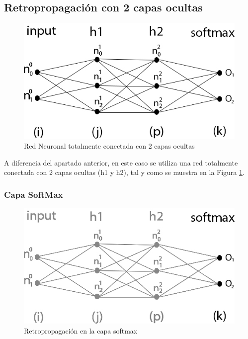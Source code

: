 \subsection{Retropropagación con 2 capas ocultas}

\begin{figure}[H]
	\centering
	\includegraphics[scale=0.35]{imagenes/nn_2_capas.jpg}  
	\caption{Red Neuronal totalmente conectada con 2 capas ocultas}
	\label{fig:nn_2_capas}
\end{figure}

A diferencia del apartado anterior, en este caso se utiliza una red totalmente conectada con 2 capas ocultas (h1 y h2), tal y como se muestra en la Figura \ref{fig:nn_2_capas}. \\

\subsubsection{Capa SoftMax}

\begin{figure}[H]
	\centering
	\includegraphics[scale=0.35]{imagenes/nn_2_capa_output.jpg}  
	\caption{Retropropagación en la capa softmax}
\end{figure}


